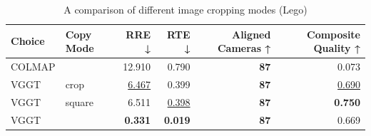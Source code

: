 \begin{table}[H]
\caption{A comparison of different image cropping modes (Lego)}
\label{tab:99_copy_mode_lego}
\begin{tabular}{llrrrr}
\toprule
Choice & Copy Mode & RRE ↓ & RTE ↓ & Aligned Cameras ↑ & Composite Quality ↑ \\
\midrule
COLMAP &  & 12.910 & 0.790 & \textbf{87} & 0.073 \\
VGGT & crop & \underline{6.467} & 0.399 & \textbf{87} & \underline{0.690} \\
VGGT & square & 6.511 & \underline{0.398} & \textbf{87} & \textbf{0.750} \\
VGGT &  & \textbf{0.331} & \textbf{0.019} & \textbf{87} & 0.669 \\
\bottomrule
\end{tabular}
\end{table}

